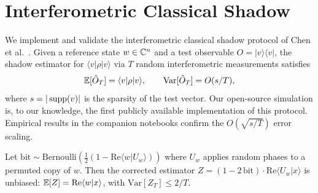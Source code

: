 \section{Interferometric Classical Shadow}
\label{sec:shadow}

We implement and validate the interferometric classical shadow protocol of Chen et al.~\cite{chen2023}.  Given a reference state $w\in\mathbb{C}^n$ and a test observable $O = |v\rangle\langle v|$, the shadow estimator for $\langle v|\rho|v\rangle$ via $T$ random interferometric measurements satisfies
\[
  \mathbb{E}[\hat{O}_T] = \langle v|\rho|v\rangle, \qquad \mathrm{Var}[\hat{O}_T] = O(s/T),
\]
where $s = |\operatorname{supp}(v)|$ is the sparsity of the test vector.  Our open-source simulation is, to our knowledge, the first publicly available implementation of this protocol.  Empirical results in the companion notebooks confirm the $O(\sqrt{s/T})$ error scaling.

Let $\mathrm{bit} \sim \mathrm{Bernoulli}\!\left(\tfrac{1}{2}(1 - \mathrm{Re}\langle w|U_w\rangle)\right)$ where $U_w$ applies random phases to a permuted copy of $w$.  Then the corrected estimator $Z = (1-2\,\mathrm{bit})\cdot \mathrm{Re}\langle U_w|x\rangle$ is unbiased: $\mathbb{E}[Z] = \mathrm{Re}\langle w|x\rangle$, with $\mathrm{Var}[Z_T] \leq 2/T$.
